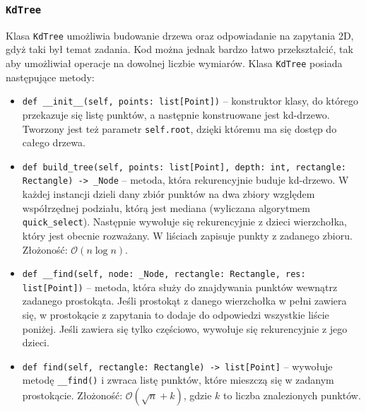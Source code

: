 \documentclass[11pt]{scrartcl}
\newcommand{\sO}{\mathcal O}
\begin{document}
\subsubsection{\texttt{KdTree}}
Klasa \texttt{KdTree} umożliwia budowanie drzewa oraz odpowiadanie na zapytania 2D, gdyż taki był temat zadania. Kod można jednak bardzo łatwo przekształcić, tak aby umożliwiał operacje na dowolnej liczbie wymiarów. Klasa \texttt{KdTree} posiada następujące metody:
\begin{itemize}
    \item \texttt{def \_\_init\_\_(self, points: list[Point])} -- konstruktor klasy, do którego przekazuje się listę punktów, a następnie konstruowane jest kd-drzewo. Tworzony jest też parametr \texttt{self.root}, dzięki któremu ma się dostęp do całego drzewa.
    \item \texttt{def build\_tree(self, points: list[Point], depth: int, rectangle: Rectangle) -> \_Node} -- metoda, która rekurencyjnie buduje kd-drzewo. W każdej instancji dzieli dany zbiór punktów na dwa zbiory względem współrzędnej podziału, którą jest mediana (wyliczana algorytmem \texttt{quick\_select}). Następnie wywołuje się rekurencyjnie z dzieci wierzchołka, który jest obecnie rozważany. W liściach zapisuje punkty z zadanego zbioru.
    Złożoność: $\sO(n \log n)$.
    \item \texttt{def \_\_find(self, node: \_Node, rectangle: Rectangle, res: list[Point])} -- metoda, która służy do znajdywania punktów wewnątrz zadanego prostokąta. Jeśli prostokąt z danego wierzchołka w pełni zawiera się, w prostokącie z zapytania to dodaje do odpowiedzi wszystkie liście poniżej. Jeśli zawiera się tylko częściowo, wywołuje się rekurencyjnie z jego dzieci.
    \item \texttt{def find(self, rectangle: Rectangle) -> list[Point]} -- wywołuje metodę \texttt{\_\_find()} i zwraca listę punktów, które mieszczą się w zadanym prostokącie.
    Złożoność: $\sO(\sqrt n + k)$, gdzie $k$ to liczba znalezionych punktów.
\end{itemize}

\newpage
\end{document}

